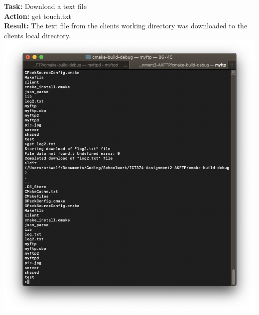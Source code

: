 \documentclass{article}
\begin{document}
\textbf{Task:} Download a text file\\
\textbf{Action:} get touch.txt\\
\textbf{Result:} The text file from the clients working directory was downloaded to the clients local directory.\\
\includegraphics[width=\textwidth]{testpictures/gettext}
\end{document}

